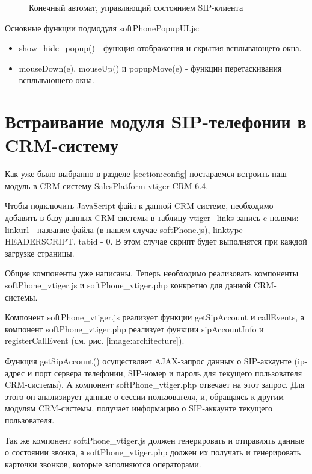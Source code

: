 \begin{figure}[h!]
\caption{Конечный автомат, управляющий состоянием SIP-клиента}
\label{image:FinalState}
\end{figure}

Основные функции подмодуля softPhonePopupUI.js:
\begin{itemize}
\item show\_hide\_popup() - функция отображения и скрытия всплывающего окна.
\item mouseDown(e), mouseUp() и popupMove(e) - функции перетаскивания всплывающего окна.
\end{itemize}

\section{Встраивание модуля SIP-телефонии в CRM-систему}

Как уже было выбранно в разделе \ref{section:config} постараемся встроить наш модуль в CRM-систему SalesPlatform vtiger CRM 6.4.

Чтобы подключить JavaScript файл к данной CRM-системе, необходимо добавить в базу данных CRM-системы в таблицу vtiger\_links запись c полями: linkurl - название файла (в нашем случае softPhone.js), linktype - HEADERSCRIPT, tabid - 0.\cite{vtiger_db} В этом случае скрипт будет выполнятся при каждой загрузке страницы.

Общие компоненты уже написаны. Теперь необходимо реализовать компоненты softPhone\_vtiger.js и softPhone\_vtiger.php конкретно для данной CRM-системы.

Компонент softPhone\_vtiger.js реализует функции getSipAccount и callEvents, а компонент softPhone\_vtiger.php реализует функции sipAccountInfo и registerCallEvent (см. рис. \ref{image:architecture}).

Функция getSipAccount() осуществляет AJAX-запрос данных о SIP-аккаунте (ip-адрес и порт сервера телефонии, SIP-номер и пароль для текущего пользователя CRM-системы). А компонент softPhone\_vtiger.php отвечает на этот запрос. Для этого он анализирует данные о сессии пользователя, и, обращаясь к другим модулям CRM-системы, получает информацию о SIP-аккаунте текущего пользователя.

Так же компонент softPhone\_vtiger.js должен генерировать и отправлять данные о состоянии звонка, а softPhone\_vtiger.php должен их получать и генерировать карточки звонков, которые заполняются операторами.

